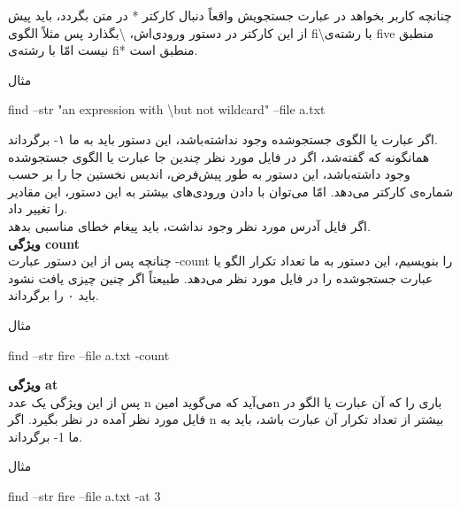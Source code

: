 \documentclass[]{article}
\begin{document}
چنانچه کاربر بخواهد در عبارت جستجویش واقعاً دنبال کارکتر * در متن بگردد، باید پیش از این کارکتر در دستور ورودی‌اش، \textbackslash بگذارد پس مثلاً الگوی fi\textbackslash * با رشته‌ی five منطبق نیست امّا با رشته‌ی fi* منطبق است.\\

\begin{mybox}[colback=yellow]{مثال}
	\begin{latin}	
		find --str "an expression with \textbackslash * but not wildcard" --file a.txt
	\end{latin}
\end{mybox}

اگر عبارت یا الگوی جستجوشده وجود نداشته‌باشد، این دستور باید به ما ۱- برگرداند.\\

\newpage
همانگونه که گفته‌شد، اگر در فایل مورد نظر چندین جا عبارت یا الگوی جستجوشده وجود داشته‌باشد، این دستور به طور پیش‌فرض، اندیس نخستین جا را بر حسب شماره‌ی کارکتر می‌دهد. امّا می‌توان با دادن ورودی‌های بیشتر به این دستور، این مقادیر را تغییر داد.\\

اگر فایل آدرس مورد نظر وجود نداشت، باید پیغام خطای مناسبی بدهد.\\

\textbf{ویژگی count}\\

چنانچه پس از این دستور عبارت -count را بنویسیم، این دستور به ما تعداد تکرار الگو یا عبارت جستجوشده را در فایل مورد نظر می‌دهد. طبیعتاً اگر چنین چیزی یافت نشود باید ۰ را برگرداند.

\begin{mybox}[colback=yellow]{مثال}
	\begin{latin}	
		find --str fire --file a.txt -count
	\end{latin}
\end{mybox}


\textbf{ویژگی at}\\

پس از این ویژگی یک عدد n می‌آید که می‌گوید امینn باری را که آن عبارت یا الگو در فایل مورد نظر آمده در نظر بگیرد. اگر n بیشتر از تعداد تکرار آن عبارت باشد، باید به ما 1- برگرداند.\\

\begin{mybox}[colback=yellow]{مثال}
	\begin{latin}	
		find --str fire --file a.txt -at 3
	\end{latin}
\end{mybox}
\end{document}
